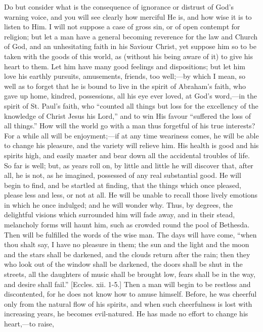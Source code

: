 Do but consider what is the consequence of ignorance
or distrust of God's warning voice, and you will see
clearly how merciful He is, and how wise it is to listen
to Him. I will not suppose a case of gross sin, or of
open contempt for religion; but let a man have a general
becoming reverence for the law and Church of God, and an
unhesitating faith in his Saviour Christ, yet suppose him
so to be taken with the goods of this world, as (without
his being aware of it) to give his heart to them. Let him
have many good feelings and dispositions; but let him
love his earthly pursuits, amusements, friends, too
well;—by which I mean, so well as to forget that he
is bound to live in the spirit of Abraham's faith, who
gave up home, kindred, possessions, all his eye ever
loved, at God's word,—in the spirit of St. Paul's
faith, who ``counted all things but loss for the
excellency of the knowledge of Christ Jesus his
Lord,'' and to win His favour ``suffered the loss
of all things.'' How will the world go with a man
thus forgetful of his true interests? For a while all
will be enjoyment;—if at any time weariness comes,
he will be able to change his pleasure, and the variety
will relieve him. His health is good and his spirits
high, and easily master and bear down all the accidental
troubles of life. So far is well; but, as years roll on,
by little and little he will discover that, after all, he
is not, as he imagined, possessed of any real substantial
good. He will begin to find, and be startled at finding,
that the things which once pleased, please less and less,
or not at all. He will be unable to recall those lively
emotions in which he once indulged; and he will wonder
why. Thus, by degrees, the delightful visions which
surrounded him will fade away, and in their stead,
melancholy forms will haunt him, such as crowded round
the pool of Bethesda. Then will be fulfilled the words of
the wise man. The days will have come, ``when thou
shalt say, I have no pleasure in them; the sun and the
light and the moon and the stars shall be darkened, and
the clouds return after the rain; then they who look out
of the window shall be darkened, the doors shall be shut
in the streets, all the daughters of music shall be
brought low, fears shall be in the way, and desire shall
fail.'' [Eccles. xii. 1-5.] Then a man will begin to
be restless and discontented, for he does not know how to
amuse himself. Before, he was cheerful only from the
natural flow of his spirits, and when such cheerfulness
is lost with increasing years, he becomes evil-natured.
He has made no effort to change his heart,—to raise,
